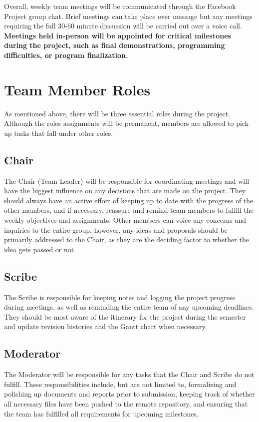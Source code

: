 \documentclass[12pt, titlepage]{article}
\begin{document}
Overall, weekly team meetings will be communicated through the Facebook Project group chat. Brief meetings can take place over message but any meetings requiring the full 30-60 minute discussion will be carried out over a voice call. \textbf{Meetings held in-person will be appointed for critical milestones during the project, such as final demonstrations, programming difficulties, or program finalization.}

\section {Team Member Roles}
As mentioned above, there will be three essential roles during the project. Although the roles assignments will be permanent, members are allowed to pick up tasks that fall under other roles. 

\subsection {Chair}
The Chair (Team Leader) will be responsible for coordinating meetings and will have the biggest influence on any decisions that are made on the project. They should always have an active effort of keeping up to date with the progress of the other members, and if necessary, reassure and remind team members to fulfill the weekly objectives and assignments. Other members can voice any concerns and inquiries to the entire group, however, any ideas and proposals should be primarily addressed to the Chair, as they are the deciding factor to whether the idea gets passed or not. 

\subsection {Scribe}
The Scribe is responsible for keeping notes and logging the project progress during meetings, as well as reminding the entire team of any upcoming deadlines. They should be most aware of the itinerary for the project during the semester and update revision histories and the Gantt chart when necessary. 

\subsection {Moderator}
The Moderator will be responsible for any tasks that the Chair and Scribe do not fulfill. These responsibilities include, but are not limited to, formalizing and polishing up documents and reports prior to submission, keeping track of whether all necessary files have been pushed to the remote repository, and ensuring that the team has fulfilled all requirements for upcoming milestones.  
\end{document}
